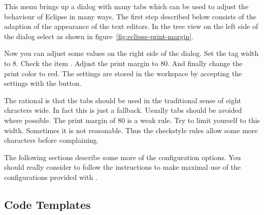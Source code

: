 This menu brings up a dialog with many tabs which can be used to
adjust the behaviour of Eclipse in many ways. The first step described
below consists of the adaption of the appearance of the text editors.
In the tree view on the left side of the dialog select  as shown in
figure~\ref{fig:eclipse-print-margin}.

Now you can adjust some values on the right side of the dialog. Set
the tag width to 8. Check the item . Adjust
the print margin to 80. And finally change the print color to red. The
settings are stored in the workspace by accepting the settings with
the  button.

The rational is that the tabs should be used in the traditional sense
of eight chracters wide. In fact this is just a fallback. Usually tabs
should be avoided where possible. The print margin of 80 is a weak
rule. Try to limit yourself to this width. Sometimes it is not
reasonable. Thus the checkstyle rules allow some more characters
before complaining.

The following sections describe some more of the configuration
options. You should really consider to follow the instructions to make
maximal use of the configurations provided with \ExTeX.



\subsection{Code Templates}

